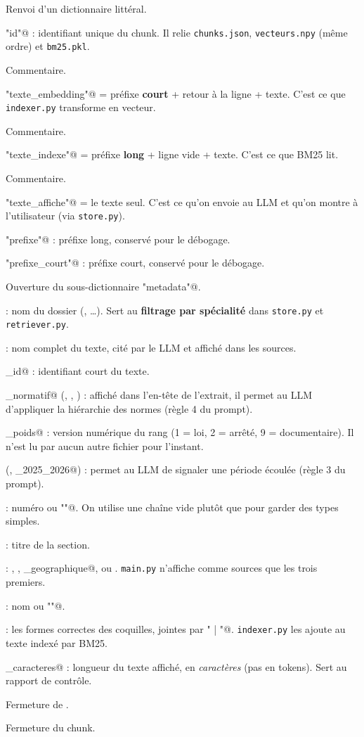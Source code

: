 \documentclass[11pt,a4paper]{article}
\newcommand{\ligne}[1]{\item[\textcolor{num}{L.\,#1}]}
\newenvironment{explication}
  {\begin{description}\setlength{\itemsep}{3pt}\setlength{\parskip}{2pt}}
  {\end{description}}
\newcommand{\fichier}[1]{\texttt{#1}}
\begin{document}
\begin{explication}
\ligne{455} Renvoi d'un dictionnaire littéral.
\ligne{456} \Verb@"id"@ : identifiant unique du chunk. Il relie \fichier{chunks.json},
\fichier{vecteurs.npy} (même ordre) et \fichier{bm25.pkl}.
\ligne{457} Commentaire.
\ligne{458} \Verb@"texte_embedding"@ = préfixe \textbf{court} + retour à la ligne + texte. C'est
ce que \fichier{indexer.py} transforme en vecteur.
\ligne{459} Commentaire.
\ligne{460} \Verb@"texte_indexe"@ = préfixe \textbf{long} + ligne vide + texte. C'est ce que BM25 lit.
\ligne{461} Commentaire.
\ligne{462} \Verb@"texte_affiche"@ = le texte seul. C'est ce qu'on envoie au LLM et qu'on montre
à l'utilisateur (via \fichier{store.py}).
\ligne{463} \Verb@"prefixe"@ : préfixe long, conservé pour le débogage.
\ligne{464} \Verb@"prefixe_court"@ : préfixe court, conservé pour le débogage.
\ligne{465} Ouverture du sous-dictionnaire \Verb@"metadata"@.
\ligne{466} \Verb@domaine@ : nom du dossier (\Verb@chasse@, \Verb@camper@…). Sert au
\textbf{filtrage par spécialité} dans \fichier{store.py} et \fichier{retriever.py}.
\ligne{467} \Verb@source@ : nom complet du texte, cité par le LLM et affiché dans les sources.
\ligne{468} \Verb@source_id@ : identifiant court du texte.
\ligne{469} \Verb@rang_normatif@ (\Verb@loi@, \Verb@arrete@, \Verb@documentaire@) : affiché dans
l'en-tête de l'extrait, il permet au LLM d'appliquer la hiérarchie des normes (règle 4 du prompt).
\ligne{470} \Verb@rang_poids@ : version numérique du rang (1 = loi, 2 = arrêté, 9 = documentaire).
Il n'est lu par aucun autre fichier pour l'instant.
\ligne{471} \Verb@validite@ (\Verb@permanent@, \Verb@saison_2025_2026@) : permet au LLM de
signaler une période écoulée (règle 3 du prompt).
\ligne{472} \Verb@article@ : numéro ou \Verb@""@. On utilise une chaîne vide plutôt que
\Verb@None@ pour garder des types simples.
\ligne{473} \Verb@titre@ : titre de la section.
\ligne{474} \Verb@type@ : \Verb@norme@, \Verb@tableau@, \Verb@zone_geographique@,
\Verb@contexte@ ou \Verb@avertissement@. \fichier{main.py} n'affiche comme sources que les
trois premiers.
\ligne{475} \Verb@gouvernorat@ : nom ou \Verb@""@.
\ligne{476} \Verb@alias@ : les formes correctes des coquilles, jointes par \Verb@" | "@.
\fichier{indexer.py} les ajoute au texte indexé par BM25.
\ligne{477} \Verb@nb_caracteres@ : longueur du texte affiché, en \emph{caractères} (pas en tokens).
Sert au rapport de contrôle.
\ligne{478} Fermeture de \Verb@metadata@.
\ligne{479} Fermeture du chunk.
\end{explication}
\end{document}

